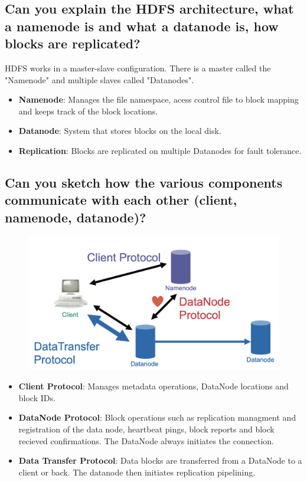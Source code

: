 \documentclass{article}
\begin{document}
\subsection{Can you explain the HDFS architecture, what a namenode is and what a datanode is, how blocks are replicated?}

HDFS works in a master-slave configuration. There is a master called the "Namenode" and multiple slaves called "Datanodes".

\begin{itemize}
    \item \textbf{Namenode}: Manages the file namespace, acess control file to block mapping and keeps track of the block locations. 
    \item \textbf{Datanode}: System that stores blocks on the local disk. 
    \item \textbf{Replication}: Blocks are replicated on multiple Datanodes for fault tolerance. 
\end{itemize}

\subsection{Can you sketch how the various components communicate with each other (client, namenode, datanode)?}

\begin{figure}
    \centering
    \includegraphics[width=0.5\linewidth]{img/hdfsoverview.png}
\end{figure}

\begin{itemize}
    \item \textbf{Client Protocol}: Manages metadata operations, DataNode locations and block IDs. 
    \item \textbf{DataNode Protocol}: Block operations such as replication managment and registration of the data node, heartbeat pings, block reports and block recieved confirmations. The DataNode always initiates the connection. 
    \item \textbf{Data Transfer Protocol}: Data blocks are transferred from a DataNode to a client or back. The datanode then initiates replication pipelining. 
\end{itemize}
\end{document}
